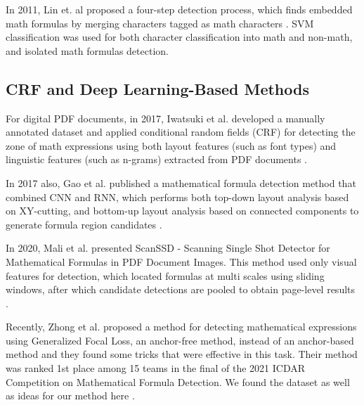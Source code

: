 In 2011, Lin et. al proposed a four-step detection process, which finds embedded math formulas by merging characters tagged as math characters \cite{Lin2011}. SVM classification was used for both character classification into math and non-math, and isolated math formulas detection.

\subsection{CRF and Deep Learning-Based Methods}
For digital PDF documents, in 2017, Iwatsuki et al.  developed a manually annotated dataset and applied conditional random fields (CRF) for detecting the zone of math expressions using both layout features (such as font types) and linguistic features (such as n-grams) extracted from PDF documents \cite{Iwatsuki2017}.

In 2017 also, Gao et al.  published a mathematical formula detection method that combined CNN and RNN, which performs both top-down layout analysis based on XY-cutting, and bottom-up layout analysis based on connected components to generate formula region candidates \cite{Gao2017}.

In 2020, Mali et al.  presented ScanSSD - Scanning Single Shot Detector for Mathematical Formulas in PDF Document Images. This method used only visual features for detection, which located formulas at multi scales using sliding windows, after which candidate detections are pooled to obtain page-level results \cite{Mali2020}.

Recently, Zhong et al. proposed a method for detecting mathematical expressions using Generalized Focal Loss, an anchor-free method, instead of an anchor-based method and they found some tricks that were effective in this task. Their method was ranked 1st place among 15 teams in the final of the 2021 ICDAR Competition on Mathematical Formula Detection. We found the dataset as well as ideas for our method here \cite{1stprize}.


